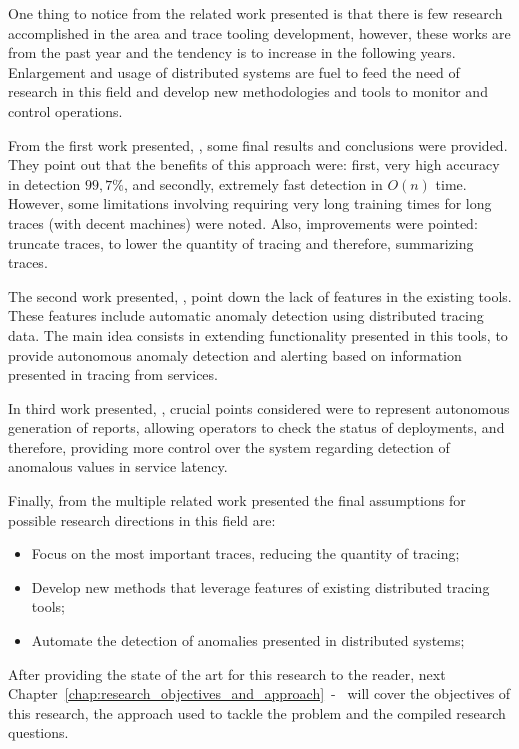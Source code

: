 One thing to notice from the related work presented is that there is few research accomplished in the area and trace tooling development, however, these works are from the past year and the tendency is to increase in the following years. Enlargement and usage of distributed systems are fuel to feed the need of research in this field and develop new methodologies and tools to monitor and control operations.

From the first work presented, , some final results and conclusions were provided. They point out that the benefits of this approach were: first, very high accuracy in detection $99,7\%$, and secondly, extremely fast detection in $O(n)$ time. However, some limitations involving requiring very long training times for long traces (with decent machines) were noted. Also, improvements were pointed: truncate traces, to lower the quantity of tracing and therefore, summarizing traces.

The second work presented, , point down the lack of features in the existing tools. These features include automatic anomaly detection using distributed tracing data. The main idea consists in extending functionality presented in this tools, to provide autonomous anomaly detection and alerting based on information presented in tracing from services.

In third work presented, , crucial points considered were to represent autonomous generation of reports, allowing operators to check the status of deployments, and therefore, providing more control over the system regarding detection of anomalous values in service latency.

Finally, from the multiple related work presented the final assumptions for possible research directions in this field are:

\begin{itemize}
    \item Focus on the most important traces, reducing the quantity of tracing;
    \item Develop new methods that leverage features of existing distributed tracing tools;
    \item Automate the detection of anomalies presented in distributed systems;
\end{itemize}

After providing the state of the art for this research to the reader, next Chapter~\ref{chap:research_objectives_and_approach}~-~ will cover the objectives of this research, the approach used to tackle the problem and the compiled research questions.

\checkoddpage
{}
{ %
    \newpage
    \blankpage}
{ %
}